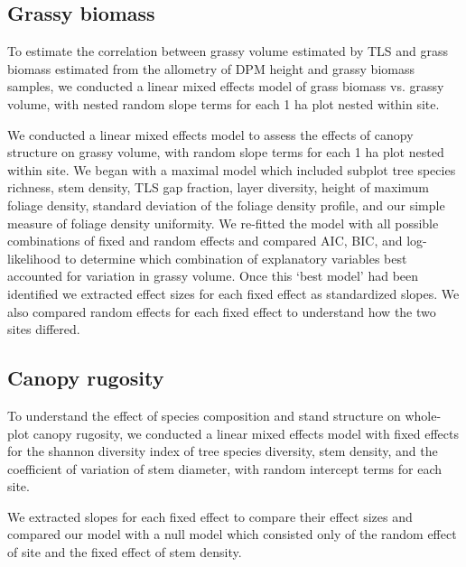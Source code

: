 \documentclass[11pt,a4paper]{article}
\begin{document}
\subsection{Grassy biomass}

To estimate the correlation between grassy volume estimated by TLS and grass biomass estimated from the allometry of DPM height and grassy biomass samples, we conducted a linear mixed effects model of grass biomass vs. grassy volume, with nested random slope terms for each 1 ha plot nested within site. 

We conducted a linear mixed effects model to assess the effects of canopy structure on grassy volume, with random slope terms for each 1 ha plot nested within site. We began with a maximal model which included subplot tree species richness, stem density, TLS gap fraction, layer diversity, height of maximum foliage density, standard deviation of the foliage density profile, and our simple measure of foliage density uniformity. We re-fitted the model with all possible combinations of fixed and random effects and compared AIC, BIC, and log-likelihood to determine which combination of explanatory variables best accounted for variation in grassy volume. Once this `best model' had been identified we extracted effect sizes for each fixed effect as standardized slopes. We also compared random effects for each fixed effect to understand how the two sites differed.

\subsection{Canopy rugosity}

To understand the effect of species composition and stand structure on whole-plot canopy rugosity, we conducted a linear mixed effects model with fixed effects for the shannon diversity index of tree species diversity, stem density, and the coefficient of variation of stem diameter, with random intercept terms for each site.

We extracted slopes for each fixed effect to compare their effect sizes and compared our model with a null model which consisted only of the random effect of site and the fixed effect of stem density.

\printbibliography
\end{document}
